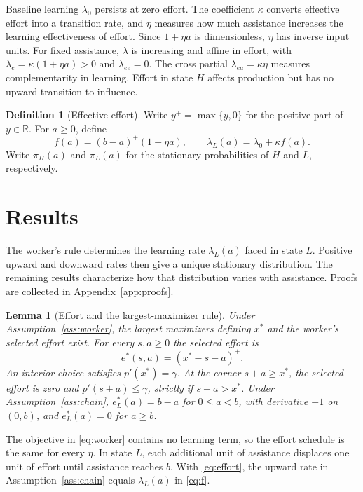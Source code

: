 \documentclass[11pt]{article}
\newtheorem{lemma}{Lemma}
\theoremstyle{definition}
\newtheorem{definition}{Definition}
\newcommand{\lam}{\lambda_L}
\newcommand{\share}{\pi_H}
\begin{document}
Baseline learning $\lambda_0$ persists at zero effort. The coefficient
$\kappa$ converts effective effort into a transition rate, and $\eta$
measures how much assistance increases the learning effectiveness of
effort. Since $1+\eta a$ is dimensionless, $\eta$ has inverse input units.
For fixed assistance, $\lambda$ is increasing and affine in effort, with
$\lambda_e=\kappa(1+\eta a)>0$ and $\lambda_{ee}=0$. The cross partial
$\lambda_{ea}=\kappa\eta$ measures complementarity in learning. Effort in
state $H$ affects production but has no upward transition to influence.

\begin{definition}[Effective effort]\label{def:f}
Write $y^+=\max\{y,0\}$ for the positive part of $y\in\mathbb R$. For
$a\geq0$, define
\begin{equation}\label{eq:f}
 f(a)=(b-a)^+(1+\eta a),\qquad \lam(a)=\lambda_0+\kappa f(a).
\end{equation}
Write $\share(a)$ and $\pi_L(a)$ for the stationary probabilities of $H$
and $L$, respectively.
\end{definition}

\section{Results}\label{sec:results}
The worker's rule determines the learning rate $\lam(a)$ faced in state
$L$. Positive upward and downward rates then give a unique stationary
distribution. The remaining results characterize how that distribution
varies with assistance. Proofs are collected in Appendix~\ref{app:proofs}.

\begin{lemma}[Effort and the largest-maximizer rule]\label{lem:effort}
Under Assumption~\ref{ass:worker}, the largest maximizers defining $x^*$
and the worker's selected effort exist. For every $s,a\geq0$ the selected
effort is
\begin{equation}\label{eq:effort}
 e^*(s,a)=(x^*-s-a)^+ .
\end{equation}
An interior choice satisfies $p'(x^*)=\gamma$. At the corner $s+a\geq x^*$,
the selected effort is zero and $p'(s+a)\leq\gamma$, strictly if
$s+a>x^*$. Under
Assumption~\ref{ass:chain}, $e_L^*(a)=b-a$ for $0\leq a<b$, with
derivative $-1$ on $(0,b)$, and $e_L^*(a)=0$ for $a\geq b$.
\end{lemma}

The objective in \eqref{eq:worker} contains no learning term, so the effort
schedule is the same for every $\eta$. In state $L$, each additional unit
of assistance displaces one unit of effort until assistance reaches $b$.
With \eqref{eq:effort}, the upward rate in Assumption~\ref{ass:chain}
equals $\lam(a)$ in \eqref{eq:f}.
\end{document}

